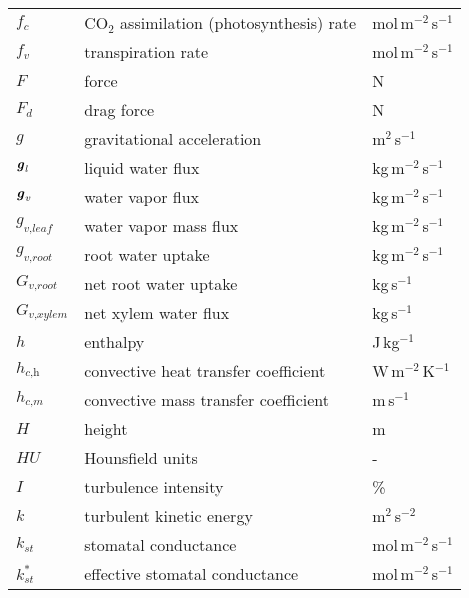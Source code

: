\begin{longtable}{p{}p{}p{}}
	$f_c$ & CO$_2$ assimilation (photosynthesis) rate & mol\,m$^{-2}$\,s$^{-1}$ \\
	$f_v$ & transpiration rate & mol\,m$^{-2}$\,s$^{-1}$ \\	
	
	$F$ & force & N \\	
	$F_d$ & drag force & N \\		
	$g$ & gravitational acceleration & m$^2$\,s$^{-1}$ \\ 
	$\textbf{\textit{g}}_{\textit{l}}$ & liquid water flux & kg\,m$^{-2}$\,s$^{-1}$ \\ 		
	$\textbf{\textit{g}}_{\textit{v}}$ & water vapor flux & kg\,m$^{-2}$\,s$^{-1}$ \\ 		
	$g_{\textit{v,leaf}}$ & water vapor mass flux & kg\,m$^{-2}$\,s$^{-1}$ \\ 	
	$g_{\textit{v,root}}$ & root water uptake & kg\,m$^{-2}$\,s$^{-1}$ \\ 		
	$G_{\textit{v,root}}$ & net root water uptake & kg\,s$^{-1}$ \\ 		
	$G_{\textit{v,xylem}}$ & net xylem water flux & kg\,s$^{-1}$ \\ 		
	$h$ & enthalpy & J\,kg$^{-1}$ \\ 
	$h_{\textit{c,h}}$ & convective heat transfer coefficient & W\,m$^{-2}$\,K$^{-1}$ \\ 
	$h_{\textit{c,m}}$ & convective mass transfer coefficient & m\,s$^{-1}$ \\ 
	$H$ & height & m \\ 
	$HU$ & Hounsfield units & - \\ 
	$I$ & turbulence intensity & \% \\
	$k$ & turbulent kinetic energy & m$^2$\,s$^{-2}$ \\ 
	$k_{\textit{st}}$ & stomatal conductance & mol\,m$^{-2}$\,s$^{-1}$  \\ 	
	$k_{\textit{st}}^*$ & effective stomatal conductance & mol\,m$^{-2}$\,s$^{-1}$  \\ 		

\end{longtable}
